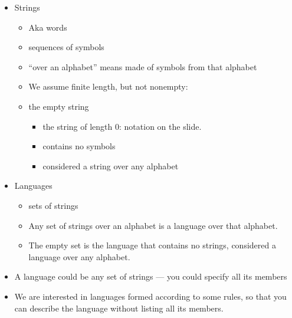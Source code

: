 \documentclass[12pt, twoside, letterpaper]{article}
\begin{document}
\begin{itemize}
	\item Strings
	\begin{itemize}
		\item Aka words
		\item sequences of symbols
		\item ``over an alphabet'' means made of symbols from that alphabet
		\item We assume finite length, but not nonempty:
		\item the empty string 
		\begin{itemize}
			\item the string of length 0: notation on the slide.
			\item contains no symbols
			\item considered a string over any alphabet
		\end{itemize}
	\end{itemize}
\end{itemize}
\begin{itemize}
	\item Languages
	\begin{itemize}
		\item sets of strings
		\item Any set of strings over an alphabet is a language over that alphabet.
		\item The empty set is the language that contains no strings, considered a language over any alphabet.
	\end{itemize}
	\item A language could be any set of strings --- you could specify all its members
	\item We are interested in languages formed according to some rules, so that you can describe the language without listing all its members.

\clearpage

\end{itemize}
\end{document}
